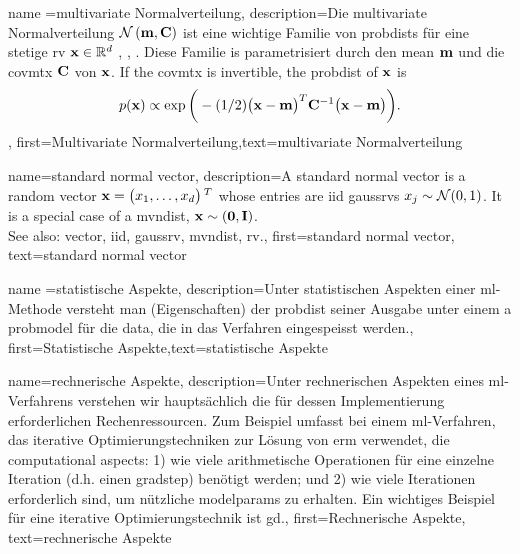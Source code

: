 {{{{{	}

{name ={multivariate Normalverteilung}, 
	description={Die  multivariate Normalverteilung
		$\mathcal{N}\left({\bf m},{\bf C}\right)$ ist eine wichtige Familie von \gls{probdist}s  für eine stetige  \gls{rv} ${\bf x} \in \mathbb{R}^{d}$ \cite{BertsekasProb}, \cite{GrayProbBook}, \cite{Lapidoth09}. 
		Diese Familie is parametrisiert durch den \gls{mean} ${\bf m}$  und die  \gls{covmtx} ${\bf C}$ von ${\bf x}$. 
		If the \gls{covmtx} is invertible, the \gls{probdist} of ${\bf x}$ is 
		$$p({\bf x}) \propto \exp\bigg(-(1/2) \big( {\bf x} - {\bf m} \big)^{T} {\bf C}^{-1} \big( {\bf x} - {\bf m} \big) \bigg).$$},
		 first={Multivariate Normalverteilung},text={multivariate Normalverteilung}}




{name={standard normal vector}, 
	description={A standard normal \gls{vector} is a random 
		\gls{vector} ${\bf x}=\big(x_{1}, \ldots, x_{d}\big)\,^{T}$ 
		whose entries are \gls{iid} \glspl{gaussrv} $x_{j} \sim \mathcal{N}(0,1)$. 
		It is a special case of a \gls{mvndist}, ${\bf x} \sim \mathcal(\mathbf{0},\mathbf{I})$.
		\\ 
		See also: \gls{vector}, \gls{iid}, \gls{gaussrv}, \gls{mvndist}, \gls{rv}.}, 
	first={standard normal vector},
	text={standard normal vector}
}

		 {name ={statistische Aspekte}, 
		 	description={Unter statistischen Aspekten einer  \gls{ml}-Methode versteht man (Eigenschaften) der \gls{probdist}
		 		seiner Ausgabe unter einem a \gls{probmodel} für die  \gls{data}, die in das Verfahren eingespeisst werden.},
		 		first={Statistische Aspekte},text={statistische Aspekte}}

{name={rechnerische Aspekte},
	description={Unter rechnerischen Aspekten  eines \gls{ml}-Verfahrens verstehen wir hauptsächlich die für dessen Implementierung erforderlichen Rechenressourcen. Zum Beispiel umfasst bei einem \gls{ml}-Verfahren, das iterative Optimierungstechniken zur Lösung von \gls{erm} verwendet, die computational aspects: 1) wie viele arithmetische Operationen für eine einzelne Iteration (d.h. einen \gls{gradstep}) benötigt werden; und 2) wie viele Iterationen erforderlich sind, um nützliche \gls{modelparams} zu erhalten. Ein wichtiges Beispiel für eine iterative Optimierungstechnik ist \gls{gd}.},
	first={Rechnerische Aspekte},
	text={rechnerische Aspekte}
}

}}}}
